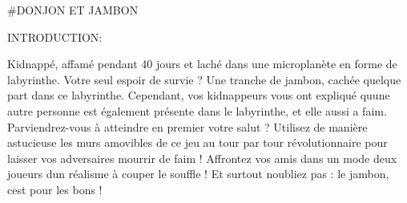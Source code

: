 \#\+D\+O\+N\+J\+ON ET J\+A\+M\+B\+ON

I\+N\+T\+R\+O\+D\+U\+C\+T\+I\+ON\+:

Kidnappé, affamé pendant 40 jours et laché dans une microplanète en forme de labyrinthe. Votre seul espoir de survie ? Une tranche de jambon, cachée quelque part dans ce labyrinthe. Cependant, vos kidnappeurs vous ont expliqué qu\textquotesingle{}une autre personne est également présente dans le labyrinthe, et elle aussi a faim. Parviendrez-\/vous à atteindre en premier votre salut ? Utilisez de manière astucieuse les murs amovibles de ce jeu au tour par tour révolutionnaire pour laisser vos adversaires mourrir de faim ! Affrontez vos amis dans un mode deux joueurs d\textquotesingle{}un réalisme à couper le souffle ! Et surtout n\textquotesingle{}oubliez pas \+: le jambon, c\textquotesingle{}est pour les bons !

